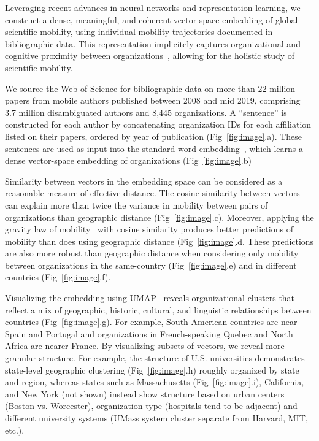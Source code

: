 \documentclass[a4paper,12pt]{article}
\begin{document}
Leveraging recent advances in neural networks and representation learning, we construct a dense, meaningful, and coherent vector-space embedding of global scientific mobility, using individual mobility trajectories documented in bibliographic data. 
This representation implicitely captures organizational and cognitive proximity between organizations~\autocite{boschma_proximity_2005}, allowing for the holistic study of scientific mobility. 

We source the Web of Science for bibliographic data on more than 22 million papers from mobile authors published between 2008 and mid 2019, comprising 3.7 million disambiguated authors and 8,445 organizations. 
A ``sentence'' is constructed for each author by concatenating organization IDs for each affiliation listed on their papers, ordered by year of publication (Fig~\ref{fig:image}.a).
These sentences are used as input into the standard word embedding~\autocite{mikolov_distributed_2013}, which learns a dense vector-space embedding of organizations (Fig~\ref{fig:image}.b) 

Similarity between vectors in the embedding space can be considered as a reasonable measure of effective distance. 
The cosine similarity between vectors can explain more than twice the variance in mobility between pairs of organizations than geographic distance (Fig~\ref{fig:image}.c). 
Moreover, applying the gravity law of mobility~\autocite{simini_universal_2012} with cosine similarity produces better predictions of mobility than does using geographic distance (Fig~\ref{fig:image}.d.
These predictions are also more robust than geographic distance when considering only mobility between organizations in the same-country (Fig~\ref{fig:image}.e) and in different countries (Fig~\ref{fig:image}.f). 

Visualizing the embedding using UMAP~\autocite{mcinnes_umap_2018} reveals organizational clusters that reflect a mix of geographic, historic, cultural, and linguistic relationships between countries (Fig~\ref{fig:image}.g). 
For example, South American countries are near Spain and Portugal and organizations in French-speaking Quebec and North Africa are nearer France. 
By visualizing subsets of vectors, we reveal more granular structure.
For example, the structure of U.S. universities demonstrates state-level geographic clustering (Fig~\ref{fig:image}.h) roughly organized by state and region, whereas states such as Massachusetts (Fig~\ref{fig:image}.i), California, and New York (not shown) instead show structure based on urban centers (Boston vs. Worcester), organization type (hospitals tend to be adjacent) and different university systems (UMass system cluster separate from Harvard, MIT, etc.).
\end{document}

